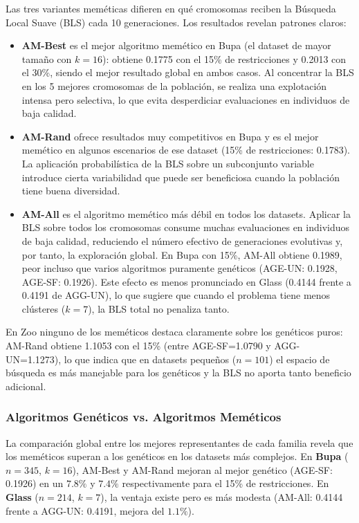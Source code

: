 \documentclass[12pt]{article}
\begin{document}
    Las tres variantes meméticas difieren en qué cromosomas reciben la Búsqueda Local Suave (BLS) cada 10 generaciones. Los resultados revelan patrones claros:
    
    \begin{itemize}
        \item \textbf{AM-Best} es el mejor algoritmo memético en {Bupa} (el dataset de mayor tamaño con $k=16$): obtiene 0.1775 con el 15\% de restricciones y 0.2013 con el 30\%, siendo el mejor resultado global en ambos casos. Al concentrar la BLS en los 5 mejores cromosomas de la población, se realiza una explotación intensa pero selectiva, lo que evita desperdiciar evaluaciones en individuos de baja calidad.
    
        \item \textbf{AM-Rand} ofrece resultados muy competitivos en Bupa y es el mejor memético en algunos escenarios de ese dataset (15\% de restricciones: 0.1783). La aplicación probabilística de la BLS sobre un subconjunto variable introduce cierta variabilidad que puede ser beneficiosa cuando la población tiene buena diversidad.
    
        \item \textbf{AM-All} es el algoritmo memético más débil en todos los datasets. Aplicar la BLS sobre todos los cromosomas consume muchas evaluaciones en individuos de baja calidad, reduciendo el número efectivo de generaciones evolutivas y, por tanto, la exploración global. En {Bupa con 15\%}, AM-All obtiene 0.1989,
        peor incluso que varios algoritmos puramente genéticos (AGE-UN: 0.1928, AGE-SF: 0.1926). Este efecto es menos pronunciado en {Glass} (0.4144 frente a 0.4191 de AGG-UN), lo que sugiere que cuando el problema tiene menos clústeres ($k=7$), la BLS total no penaliza tanto.
    \end{itemize}

    En {Zoo} ninguno de los meméticos destaca claramente sobre los genéticos puros: AM-Rand obtiene 1.1053 con el 15\% (entre AGE-SF=1.0790 y AGG-UN=1.1273), lo que indica que en datasets pequeños ($n=101$) el espacio de búsqueda es más manejable para los genéticos y la BLS no aporta tanto beneficio adicional.
    
    \subsubsection{Algoritmos Genéticos vs. Algoritmos Meméticos}
    
    La comparación global entre los mejores representantes de cada familia revela que los meméticos superan a los genéticos en los datasets más complejos. En \textbf{Bupa} ($n=345$, $k=16$), AM-Best y AM-Rand mejoran al mejor genético (AGE-SF: 0.1926) en un $7.8\%$ y $7.4\%$ respectivamente para el 15\% de restricciones. En \textbf{Glass} ($n=214$, $k=7$), la ventaja existe pero es más modesta (AM-All: 0.4144 frente a AGG-UN: 0.4191, mejora del $1.1\%$).\\
    
\end{document}

